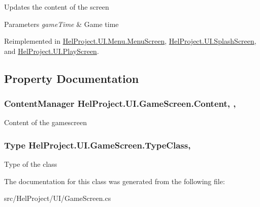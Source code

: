 Updates the content of the screen 


\begin{DoxyParams}{Parameters}
{\em game\+Time} & Game time\\
\hline
\end{DoxyParams}


Reimplemented in \hyperlink{class_hel_project_1_1_u_i_1_1_menu_1_1_menu_screen_af7295758606c3cb7124983c86a51ecae}{Hel\+Project.\+U\+I.\+Menu.\+Menu\+Screen}, \hyperlink{class_hel_project_1_1_u_i_1_1_splash_screen_abf282bea4e6f1ee8a6ab03f812f130d3}{Hel\+Project.\+U\+I.\+Splash\+Screen}, and \hyperlink{class_hel_project_1_1_u_i_1_1_play_screen_a012a79b297f9e09a0d21dbe952a653db}{Hel\+Project.\+U\+I.\+Play\+Screen}.



\subsection{Property Documentation}
\hypertarget{class_hel_project_1_1_u_i_1_1_game_screen_a50939223833b9fd49a5110bbc950c9df}{}
\subsubsection[{Content}]{\setlength{\rightskip}{0pt plus 5cm}Content\+Manager Hel\+Project.\+U\+I.\+Game\+Screen.\+Content\hspace{0.3cm}{\ttfamily [get]}, {\ttfamily [set]}, {\ttfamily [protected]}}\label{class_hel_project_1_1_u_i_1_1_game_screen_a50939223833b9fd49a5110bbc950c9df}


Content of the gamescreen 

\hypertarget{class_hel_project_1_1_u_i_1_1_game_screen_a1b6b8e12968c6b376a83fd56abb61eb6}{}
\subsubsection[{Type\+Class}]{\setlength{\rightskip}{0pt plus 5cm}Type Hel\+Project.\+U\+I.\+Game\+Screen.\+Type\+Class\hspace{0.3cm}{\ttfamily [get]}, {\ttfamily [set]}}\label{class_hel_project_1_1_u_i_1_1_game_screen_a1b6b8e12968c6b376a83fd56abb61eb6}


Type of the class 



The documentation for this class was generated from the following file\+:\begin{DoxyCompactItemize}
\item 
src/\+Hel\+Project/\+U\+I/Game\+Screen.\+cs\end{DoxyCompactItemize}
